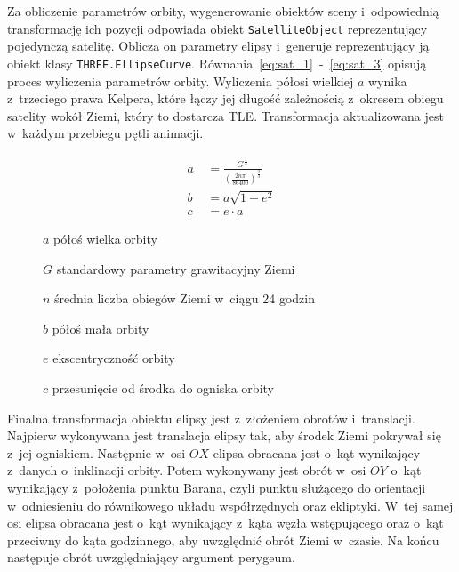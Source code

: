 Za obliczenie parametrów orbity, wygenerowanie obiektów sceny i~odpowiednią transformację ich pozycji odpowiada obiekt \texttt{SatelliteObject} reprezentujący pojedynczą satelitę. Oblicza on parametry elipsy i~generuje reprezentujący ją obiekt klasy \texttt{THREE.EllipseCurve}. Równania~\ref{eq:sat_1}~-~\ref{eq:sat_3} opisują proces wyliczenia parametrów orbity. Wyliczenia półosi wielkiej $a$ wynika z~trzeciego prawa Kelpera, które łączy jej długość zależnością z~okresem obiegu satelity wokół Ziemi, który to dostarcza TLE. Transformacja aktualizowana jest w~każdym przebiegu pętli animacji.

\begin{samepage}
  \begin{figure}[h]
  \begin{align}
      \label{eq:sat_1}
      a~&= \frac{G^{\frac{1}{3}}}{(\frac{2n\pi}{86400})^{\frac{2}{3}}} \\
      \label{eq:sat_2}
      b &= a\sqrt{1-e^2} \\
      \label{eq:sat_3}
      c &= e \cdot a
  \end{align}
  \begin{eqexpl}[25mm]
      \item {$a$} półoś wielka orbity
      \item {$G$} standardowy parametry grawitacyjny Ziemi
      \item {$n$} średnia liczba obiegów Ziemi w~ciągu 24 godzin
      \item {$b$} półoś mała orbity
      \item {$e$} ekscentryczność orbity
      \item {$c$} przesunięcie od środka do ogniska orbity
  \end{eqexpl}
  \vspace{\baselineskip}
\end{figure}
\end{samepage}

Finalna transformacja obiektu elipsy jest z~złożeniem obrotów i~translacji. Najpierw wykonywana jest translacja elipsy tak, aby środek Ziemi pokrywał się z~jej ogniskiem. Następnie w~osi $OX$ elipsa obracana jest o~kąt wynikający z~danych o~inklinacji orbity.  Potem wykonywany jest obrót w~osi $OY$ o~kąt wynikający z~położenia punktu Barana, czyli punktu służącego do orientacji w~odniesieniu do równikowego układu współrzędnych oraz ekliptyki. W~tej samej osi elipsa obracana jest o~kąt wynikający z~kąta węzła wstępującego oraz o~kąt przeciwny do kąta godzinnego, aby uwzględnić obrót Ziemi w~czasie. Na końcu następuje obrót uwzględniający argument perygeum. 

